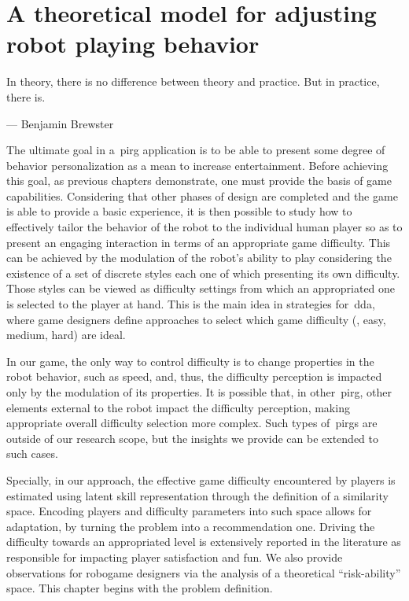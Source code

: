 \chapter{A theoretical model for adjusting robot playing behavior}\label{ch:adaptation}
\epigraph{In theory, there is no difference between theory and practice. But in practice, there is. 
}{--- Benjamin Brewster}

The ultimate goal in a~\gls{pirg} application is to be able to present some degree of behavior personalization as a mean to increase entertainment. Before achieving this goal, as previous chapters demonstrate, one must provide the basis of game capabilities. Considering that other phases of design are completed and the game is able to provide a basic experience, it is then possible to study how to effectively tailor the behavior of the robot to the individual human player so as to present an engaging interaction in terms of an appropriate game difficulty. This can be achieved by the modulation of the robot's ability to play considering the existence of a set of discrete styles each one of which presenting its own difficulty. Those styles can be viewed as difficulty settings from which an appropriated one is selected to the player at hand. This is the main idea in strategies for~\glsdesc{dda}, where game designers define approaches to select which game difficulty (\eg, easy, medium, hard) are ideal. 

In our game, the only way to control difficulty is to change properties in the robot behavior, such as speed, and, thus, the difficulty perception is impacted only by the modulation of its properties. It is possible that, in other~\gls{pirg}, other elements external to the robot impact the difficulty perception, making appropriate overall difficulty selection more complex. Such types of~\gls{pirg}s are outside of our research scope, but the insights we provide can be extended to such cases. 

Specially, in our approach, the effective game difficulty encountered by players is estimated using latent skill representation through the definition of a similarity space. Encoding players and difficulty parameters into such space allows for adaptation, by turning the problem into a recommendation one. Driving the difficulty towards an appropriated level is extensively reported in the literature as responsible for impacting player satisfaction and fun. We also provide observations for robogame designers via the analysis of a theoretical ``risk-ability'' space. This chapter begins with the problem definition.

